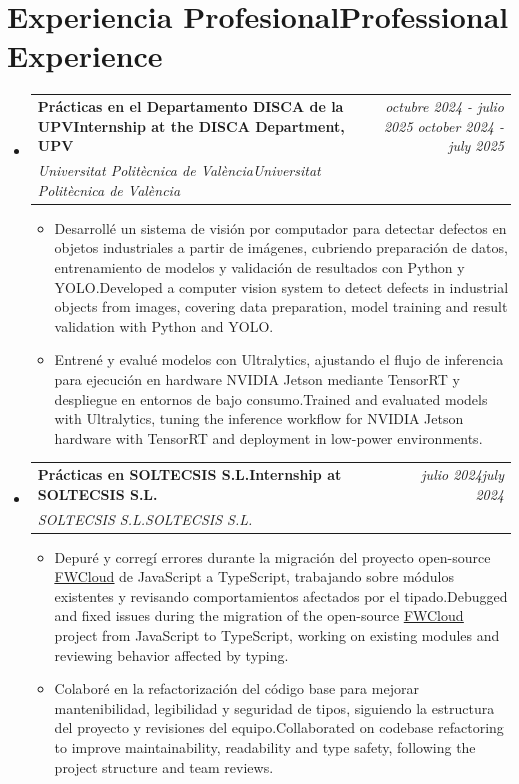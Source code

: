 \documentclass[11pt,a4paper]{article}
\makeatletter
\newcommand{\resumeProject}[4]{
\vspace{0.5mm}\item
    \begin{tabular*}{0.98\textwidth}[t]{l@{\extracolsep{\fill}}r}
        \textbf{#1} & \textit{\footnotesize{#3}} \\
        \footnotesize{\textit{#2}} & \footnotesize{#4}
    \end{tabular*}
    \vspace{-2.4mm}
}
\newcommand{\resumeSubHeadingListStart}{\begin{itemize}[leftmargin=*,labelsep=0mm]}
\newcommand{\resumeItemListStart}{\begin{justify}\begin{itemize}[leftmargin=3ex, rightmargin=2ex, noitemsep,labelsep=1.2mm,itemsep=0mm]\small}
\newcommand{\resumeSubHeadingListEnd}{\end{itemize}\vspace{2mm}}
\newcommand{\resumeItemListEnd}{\end{itemize}\end{justify}\vspace{-2mm}}
\makeatother
\begin{document}
\section{\textbf{\ifdefined\spanish Experiencia Profesional\else Professional Experience\fi}}
  \resumeSubHeadingListStart
    \resumeProject
      {\ifdefined\spanish Prácticas en el Departamento DISCA de la UPV\else Internship at the DISCA Department, UPV\fi}
      {\ifdefined\spanish Universitat Politècnica de València\else Universitat Politècnica de València\fi}
      {\ifdefined\spanish octubre 2024 - julio 2025 \else october 2024 - july 2025\fi}
      {}
    \resumeItemListStart
        \item {\ifdefined\spanish Desarrollé un sistema de visión por computador para detectar defectos en objetos industriales a partir de imágenes, cubriendo preparación de datos, entrenamiento de modelos y validación de resultados con Python y YOLO.\else Developed a computer vision system to detect defects in industrial objects from images, covering data preparation, model training and result validation with Python and YOLO.\fi}
        \item {\ifdefined\spanish Entrené y evalué modelos con Ultralytics, ajustando el flujo de inferencia para ejecución en hardware NVIDIA Jetson mediante TensorRT y despliegue en entornos de bajo consumo.\else Trained and evaluated models with Ultralytics, tuning the inference workflow for NVIDIA Jetson hardware with TensorRT and deployment in low-power environments.\fi}
    \resumeItemListEnd
  \resumeSubHeadingListEnd

  \vspace{-5.5mm}

  \resumeSubHeadingListStart
    \resumeProject
      {\ifdefined\spanish Prácticas en SOLTECSIS S.L.\else Internship at SOLTECSIS S.L.\fi}
      {\ifdefined\spanish SOLTECSIS S.L.\else SOLTECSIS S.L.\fi}
      {\ifdefined\spanish julio 2024\else july 2024\fi}
      {}
    \resumeItemListStart
        \item {\ifdefined\spanish Depuré y corregí errores durante la migración del proyecto open-source \href{https://github.com/soltecsis/fwcloud-api}{\underline{FWCloud}} de JavaScript a TypeScript, trabajando sobre módulos existentes y revisando comportamientos afectados por el tipado.\else Debugged and fixed issues during the migration of the open-source \href{https://github.com/soltecsis/fwcloud-api}{\underline{FWCloud}} project from JavaScript to TypeScript, working on existing modules and reviewing behavior affected by typing.\fi}
        \item {\ifdefined\spanish Colaboré en la refactorización del código base para mejorar mantenibilidad, legibilidad y seguridad de tipos, siguiendo la estructura del proyecto y revisiones del equipo.\else Collaborated on codebase refactoring to improve maintainability, readability and type safety, following the project structure and team reviews.\fi}
    \resumeItemListEnd
  \resumeSubHeadingListEnd
\end{document}

